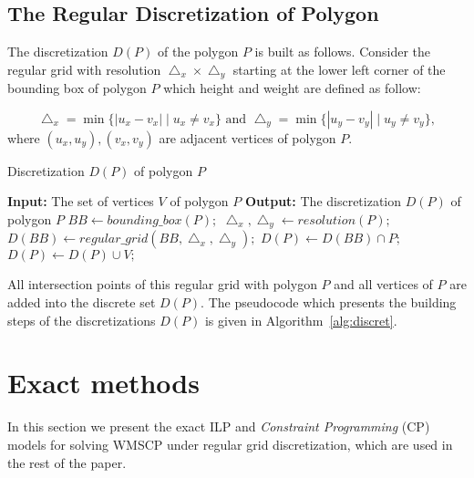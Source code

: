 \documentclass[runningheads,a4paper]{elsarticle}
\begin{document}
	
	\subsection{The Regular Discretization of Polygon}  
	The discretization $D(P)$ of the polygon $P$ is built as follows. Consider the regular grid with resolution $\bigtriangleup_{x}\times\bigtriangleup_{y}$ starting at the lower left corner of the bounding box of polygon $P$ which height and weight are defined as follow: 
 
	\begin{equation}
         \bigtriangleup_{x}=\min\{ |u_{x}-v_{x}|\mid u_{x}\neq v_{x}\} \mbox{ and }
         \bigtriangleup_{y}=\min\{ |u_{y}-v_{y}|\mid u_{y}\neq v_{y}\},
 	\end{equation}
where $ (u_{x},u_{y}),(v_{x},v_{y})$ are adjacent vertices of polygon $P$.
	
	\begin{algorithm}[!t]
		\caption{Discretization $D(P)$ of polygon $P$}\label{alg:discret}
		\begin{algorithmic}[1]
			\State \textbf{Input:} The set of vertices $V$ of polygon $P$
			\State \textbf{Output:} The discretization $D(P)$ of polygon $P$
			\State $BB \gets bounding\_box(P);$
			\State $\bigtriangleup_{x},\bigtriangleup_{y} \gets resolution(P);$
			\State $D(BB) \gets regular\_grid(BB,\bigtriangleup_{x},\bigtriangleup_{y});$
			\State $D(P) \gets D(BB) \cap P;$
			\State $D(P) \gets D(P) \cup V;$
		\end{algorithmic}
	\end{algorithm}

	All intersection points of this regular grid with polygon $P$ and all vertices of $P$ are added into the discrete set $D(P)$. The pseudocode which presents the building steps of the discretizations $D(P)$ is given in Algorithm~\ref{alg:discret}.
	
	
	\section{Exact methods}
	In this section we present the exact ILP and \emph{Constraint Programming} (CP) models for solving WMSCP  under regular grid discretization, which are used  in the rest of the paper.
\end{document}
